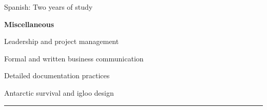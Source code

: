 \documentclass[10pt,letterpaper]{article}
\begin{document}
\begin{itemize*}
\begin{itemize*}
            \item Spanish: Two years of study
        \end{itemize*}
    \item \textbf{Miscellaneous}
        \begin{itemize*}
            \item Leadership and project management
            \item Formal and written business communication
            \item Detailed documentation practices
            \item Antarctic survival and igloo design
        \end{itemize*}
\end{itemize*}

\hrule
\vspace{-0.4em}
\end{document}
